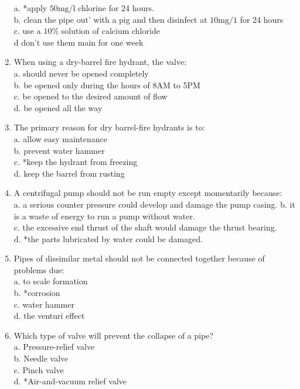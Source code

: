 \begin{enumerate}[1.]
a. *apply $50 \mathrm{mg} / \mathrm{l}$ chlorine for 24 hours.\\
b. clean the pipe out' with a pig and then disinfect at $10 \mathrm{mg} / 1$ for 24 hours\\
c. use a $10 \%$ solution of calcium chloride\\
$\mathrm{d}$ don't use them main for one week\\
\item When using a dry-barrel fire hydrant, the valve:\\
a. should never be opened completely\\
b. be opened only during the hours of 8AM to 5PM\\
c. be opened to the desired amount of flow\\
d. be opened all the way\\
\item The primary reason for dry barrel-fire hydrants is to:\\
a. allow easy maintenance\\
b. prevent water hammer\\
c. *keep the hydrant from freezing\\
d. keep the barrel from rusting\\
\item A centrifugal pump should not be run empty except momentarily because:\\
a. a serious counter pressure could develop and damage the pump casing. b. it is a waste of energy to run a pump without water.\\
c. the excessive end thrust of the shaft would damage the thrust bearing.\\
d. *the parts lubricated by water could be damaged.\\
\item Pipes of dissimilar metal should not be connected together because of problems due:\\
a. to scale formation\\
b. *corrosion\\
c. water hammer\\
d. the venturi effect\\
\item Which type of valve will prevent the collapse of a pipe?\\
a. Pressure-relief valve\\
b. Needle valve\\
c. Pinch valve\\
d. *Air-and-vacuum relief valve\\

\end{enumerate}
